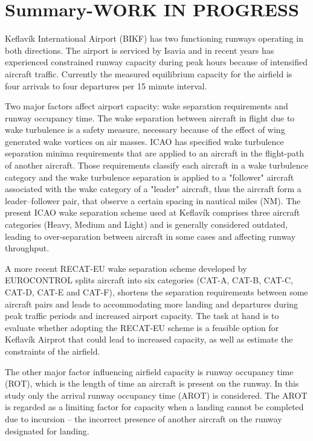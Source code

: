 


\chapter{Summary-WORK IN PROGRESS}\label{cha:summary}

Keflavík International Airport (BIKF) has two functioning runways operating in both directions. The airport is serviced by Isavia and in recent years has experienced constrained runway capacity during peak hours because of intensified aircraft traffic. Currently the measured equilibrium capacity for the airfield is four arrivals to four departures per 15 minute interval. 

Two major factors affect airport capacity: wake separation requirements and runway occupancy time. The wake  separation between aircraft in flight due to wake turbulence is a safety measure, necessary because of the effect of wing generated wake vortices on air masses. ICAO has specified wake turbulence separation minima requirements that are applied to an aircraft in the flight-path of another aircraft. Those requirements classify each aircraft in a wake turbulence category and the wake turbulence separation is applied to a "follower" aircraft associated with the wake category of a "leader" aircraft, thus the aircraft form a leader--follower pair, that observe a certain spacing in nautical miles (NM). The present ICAO wake separation scheme used at Keflavík comprises three aircraft categories (Heavy, Medium and Light) and is generally considered outdated, leading to over-separation between aircraft in some cases and affecting runway throughput. 

A more recent RECAT-EU wake separation scheme developed by EUROCONTROL splits aircraft into six categories (CAT-A, CAT-B, CAT-C, CAT-D, CAT-E and CAT-F), shortens the separation requirements between some aircraft pairs and leads to accommodating more landing and departures during peak traffic periods and increased airport capacity. The task at hand is to evaluate whether adopting the RECAT-EU scheme is a feasible option for Keflavík Airprot that could lead to increased capacity, as well as estimate the constraints of the airfield. 

The other major factor influencing airfield capacity is runway occupancy time (ROT), which is the length of time an aircraft is present on the runway. In this study only the arrival runway occupancy time (AROT) is considered. The AROT is regarded as a limiting factor for capacity when a landing cannot be completed due to incursion -- the incorrect presence of another aircraft on the runway designated for landing. 

